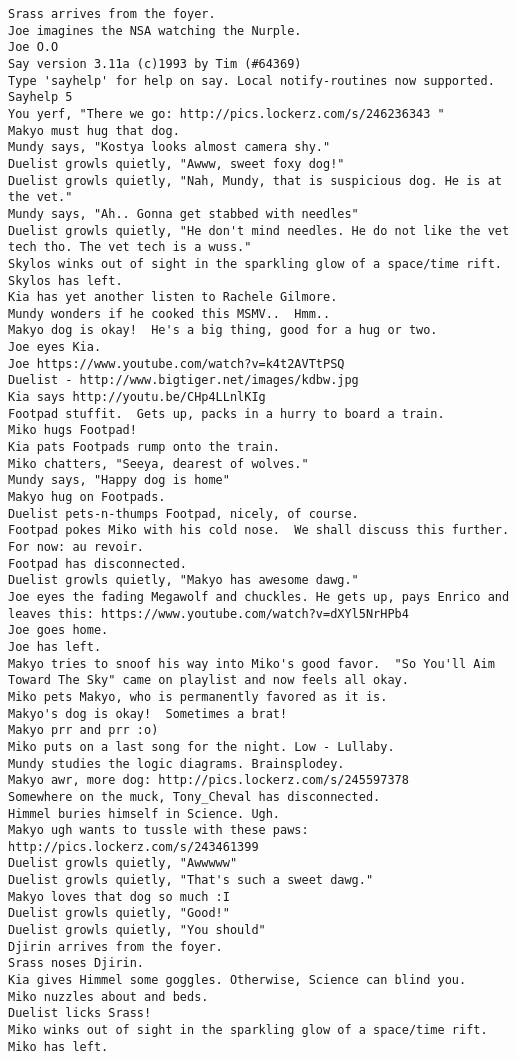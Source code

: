 \begin{verbatim}
Srass arrives from the foyer.
Joe imagines the NSA watching the Nurple.
Joe O.O
Say version 3.11a (c)1993 by Tim (#64369)
Type 'sayhelp' for help on say. Local notify-routines now supported. Sayhelp 5
You yerf, "There we go: http://pics.lockerz.com/s/246236343 "
Makyo must hug that dog.
Mundy says, "Kostya looks almost camera shy."
Duelist growls quietly, "Awww, sweet foxy dog!"
Duelist growls quietly, "Nah, Mundy, that is suspicious dog. He is at the vet."
Mundy says, "Ah.. Gonna get stabbed with needles"
Duelist growls quietly, "He don't mind needles. He do not like the vet tech tho. The vet tech is a wuss."
Skylos winks out of sight in the sparkling glow of a space/time rift.
Skylos has left.
Kia has yet another listen to Rachele Gilmore.
Mundy wonders if he cooked this MSMV..  Hmm..
Makyo dog is okay!  He's a big thing, good for a hug or two.
Joe eyes Kia.
Joe https://www.youtube.com/watch?v=k4t2AVTtPSQ
Duelist - http://www.bigtiger.net/images/kdbw.jpg
Kia says http://youtu.be/CHp4LLnlKIg
Footpad stuffit.  Gets up, packs in a hurry to board a train.
Miko hugs Footpad!
Kia pats Footpads rump onto the train.
Miko chatters, "Seeya, dearest of wolves."
Mundy says, "Happy dog is home"
Makyo hug on Footpads.
Duelist pets-n-thumps Footpad, nicely, of course.
Footpad pokes Miko with his cold nose.  We shall discuss this further.  For now: au revoir.
Footpad has disconnected.
Duelist growls quietly, "Makyo has awesome dawg."
Joe eyes the fading Megawolf and chuckles. He gets up, pays Enrico and leaves this: https://www.youtube.com/watch?v=dXYl5NrHPb4
Joe goes home.
Joe has left.
Makyo tries to snoof his way into Miko's good favor.  "So You'll Aim Toward The Sky" came on playlist and now feels all okay.
Miko pets Makyo, who is permanently favored as it is.
Makyo's dog is okay!  Sometimes a brat!
Makyo prr and prr :o)
Miko puts on a last song for the night. Low - Lullaby.
Mundy studies the logic diagrams. Brainsplodey.
Makyo awr, more dog: http://pics.lockerz.com/s/245597378
Somewhere on the muck, Tony_Cheval has disconnected.
Himmel buries himself in Science. Ugh.
Makyo ugh wants to tussle with these paws: http://pics.lockerz.com/s/243461399
Duelist growls quietly, "Awwwww"
Duelist growls quietly, "That's such a sweet dawg."
Makyo loves that dog so much :I
Duelist growls quietly, "Good!"
Duelist growls quietly, "You should"
Djirin arrives from the foyer.
Srass noses Djirin.
Kia gives Himmel some goggles. Otherwise, Science can blind you.
Miko nuzzles about and beds.
Duelist licks Srass!
Miko winks out of sight in the sparkling glow of a space/time rift.
Miko has left.

\end{verbatim}
